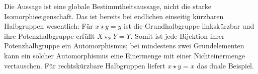 \documentclass[main.tex]{subfiles}
\begin{document}
\begin{tabproofsplitwide}
  \closeproofpartwide
\end{tabproofsplitwide}
\endgroup

Die Aussage ist eine globale Bestimmtheitsaussage, nicht die starke
Isomorphieeigenschaft.  Das ist bereits bei endlichen einseitig kürzbaren
Halbgruppen wesentlich: Für \(x\star y=y\) ist die Grundhalbgruppe
linkskürzbar und ihre Potenzhalbgruppe erfüllt \(X\star_{\mathcal P}Y=Y\).
Somit ist jede Bijektion ihrer Potenzhalbgruppe ein Automorphismus; bei
mindestens zwei Grundelementen kann ein solcher Automorphismus eine
Einermenge mit einer Nichteinermenge vertauschen.  Für rechtskürzbare
Halbgruppen liefert \(x\star y=x\) das duale Beispiel.
\end{document}
